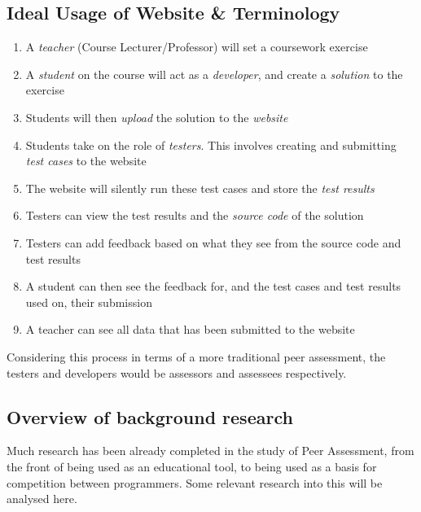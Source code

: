 \documentclass[a4paper,11pt]{report}
\begin{document}
\subsection{Ideal Usage of Website \& Terminology}
\begin{enumerate}
 \item A \textit{teacher} (Course Lecturer/Professor) will set a coursework exercise
 \item A \textit{student} on the course will act as a \textit{developer}, and create a \textit{solution} to the exercise
 \item Students will then \textit{upload} the solution to the \textit{website}
 \item Students take on the role of \textit{testers}. This involves creating and submitting \textit{test cases} to the website
 \item The website will silently run these test cases and store the \textit{test results}
 \item Testers can view the test results and the \textit{source code} of the solution
 \item Testers can add feedback based on what they see from the source code and test results
 \item A student can then see the feedback for, and the test cases and test results used on, their submission
 \item A teacher can see all data that has been submitted to the website 
\end{enumerate}
Considering this process in terms of a more traditional peer assessment, the testers and developers would be assessors and assessees respectively.

\subsection{Overview of background research}
Much research has been already completed in the study of Peer Assessment, from the front of being used as an educational tool, to being used as a basis for competition between programmers. Some relevant research into this will be analysed here.

\end{document}
